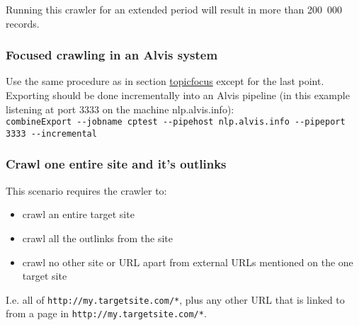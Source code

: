 Running this crawler for an extended period will result in more than
200~000 records.

\subsubsection{Focused crawling in an Alvis system}
Use the same procedure as in section \hyperref{Focused crawling -- topic specific}{}{ (Focused crawling -- topic specific)}{topicfocus}
except for the last point. Exporting should be done incrementally into an Alvis
pipeline (in this example listening at port 3333 on the machine nlp.alvis.info):\\
\verb+combineExport --jobname cptest --pipehost nlp.alvis.info --pipeport 3333 --incremental+

\subsubsection{Crawl one entire site and it's outlinks}
This scenario requires the crawler to:
\begin{itemize}
  \item  crawl an entire target site
  \item  crawl all the outlinks from the site
  \item  crawl no other site or URL apart from
         external URLs mentioned on the one target site
\end{itemize}

I.e. all of \verb+http://my.targetsite.com/*+,
plus any other URL that is linked to from a page in
\verb+http://my.targetsite.com/*+.

